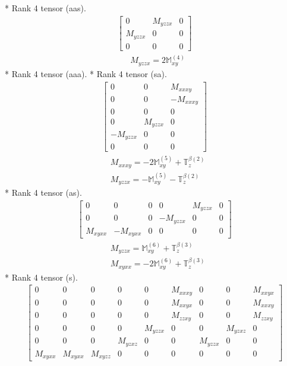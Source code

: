 \documentclass[fleqn,8pt,landscape]{jsarticle}
\begin{document}
* Rank 4 tensor (aas).
\begin{align*}
\begin{bmatrix} 0 & M_{yzzx} & 0 \\ M_{yzzx} & 0 & 0 \\ 0 & 0 & 0 \end{bmatrix}
\end{align*}
\begin{align*}
& M_{yzzx} = 2 \mathbb{M}_{xy}^{(4)}
\end{align*}
* Rank 4 tensor (aaa).
* Rank 4 tensor (sa).
\begin{align*}
\begin{bmatrix} 0 & 0 & M_{xxxy} \\ 0 & 0 & - M_{xxxy} \\ 0 & 0 & 0 \\ 0 & M_{yzzx} & 0 \\ - M_{yzzx} & 0 & 0 \\ 0 & 0 & 0 \end{bmatrix}
\end{align*}
\begin{align*}
& M_{xxxy} = - 2 \mathbb{M}_{xy}^{(5)} + \mathbb{T}_{z}^{\beta(2)} \\
& M_{yzzx} = - \mathbb{M}_{xy}^{(5)} - \mathbb{T}_{z}^{\beta(2)}
\end{align*}
* Rank 4 tensor (as).
\begin{align*}
\begin{bmatrix} 0 & 0 & 0 & 0 & M_{yzzx} & 0 \\ 0 & 0 & 0 & - M_{yzzx} & 0 & 0 \\ M_{xyxx} & - M_{xyxx} & 0 & 0 & 0 & 0 \end{bmatrix}
\end{align*}
\begin{align*}
& M_{yzzx} = \mathbb{M}_{xy}^{(6)} + \mathbb{T}_{z}^{\beta(3)} \\
& M_{xyxx} = - 2 \mathbb{M}_{xy}^{(6)} + \mathbb{T}_{z}^{\beta(3)}
\end{align*}
* Rank 4 tensor (s).
\begin{align*}
\begin{bmatrix} 0 & 0 & 0 & 0 & 0 & M_{xxxy} & 0 & 0 & M_{xxyx} \\ 0 & 0 & 0 & 0 & 0 & M_{xxyx} & 0 & 0 & M_{xxxy} \\ 0 & 0 & 0 & 0 & 0 & M_{zzxy} & 0 & 0 & M_{zzxy} \\ 0 & 0 & 0 & 0 & M_{yzzx} & 0 & 0 & M_{yzxz} & 0 \\ 0 & 0 & 0 & M_{yzxz} & 0 & 0 & M_{yzzx} & 0 & 0 \\ M_{xyxx} & M_{xyxx} & M_{xyzz} & 0 & 0 & 0 & 0 & 0 & 0 \end{bmatrix}
\end{align*}
\end{document}
